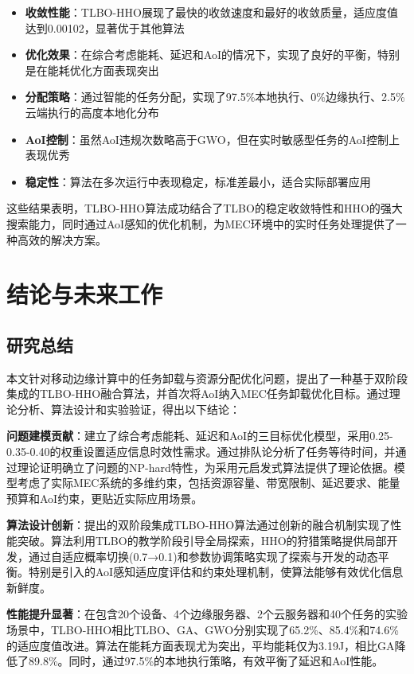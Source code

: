\documentclass[conference]{IEEEtran}
\begin{document}
\begin{itemize}
    \item \textbf{收敛性能}：TLBO-HHO展现了最快的收敛速度和最好的收敛质量，适应度值达到0.00102，显著优于其他算法
    \item \textbf{优化效果}：在综合考虑能耗、延迟和AoI的情况下，实现了良好的平衡，特别是在能耗优化方面表现突出
    \item \textbf{分配策略}：通过智能的任务分配，实现了97.5\%本地执行、0\%边缘执行、2.5\%云端执行的高度本地化分布
    \item \textbf{AoI控制}：虽然AoI违规次数略高于GWO，但在实时敏感型任务的AoI控制上表现优秀
    \item \textbf{稳定性}：算法在多次运行中表现稳定，标准差最小，适合实际部署应用
\end{itemize}

这些结果表明，TLBO-HHO算法成功结合了TLBO的稳定收敛特性和HHO的强大搜索能力，同时通过AoI感知的优化机制，为MEC环境中的实时任务处理提供了一种高效的解决方案。

\section{结论与未来工作}
\subsection{研究总结}
本文针对移动边缘计算中的任务卸载与资源分配优化问题，提出了一种基于双阶段集成的TLBO-HHO融合算法，并首次将AoI纳入MEC任务卸载优化目标。通过理论分析、算法设计和实验验证，得出以下结论：

\textbf{问题建模贡献}：建立了综合考虑能耗、延迟和AoI的三目标优化模型，采用0.25-0.35-0.40的权重设置适应信息时效性需求。通过排队论分析了任务等待时间，并通过理论证明确立了问题的NP-hard特性，为采用元启发式算法提供了理论依据。模型考虑了实际MEC系统的多维约束，包括资源容量、带宽限制、延迟要求、能量预算和AoI约束，更贴近实际应用场景。

\textbf{算法设计创新}：提出的双阶段集成TLBO-HHO算法通过创新的融合机制实现了性能突破。算法利用TLBO的教学阶段引导全局探索，HHO的狩猎策略提供局部开发，通过自适应概率切换(0.7→0.1)和参数协调策略实现了探索与开发的动态平衡。特别是引入的AoI感知适应度评估和约束处理机制，使算法能够有效优化信息新鲜度。

\textbf{性能提升显著}：在包含20个设备、4个边缘服务器、2个云服务器和40个任务的实验场景中，TLBO-HHO相比TLBO、GA、GWO分别实现了65.2\%、85.4\%和74.6\%的适应度值改进。算法在能耗方面表现尤为突出，平均能耗仅为3.19J，相比GA降低了89.8\%。同时，通过97.5\%的本地执行策略，有效平衡了延迟和AoI性能。
\end{document}
